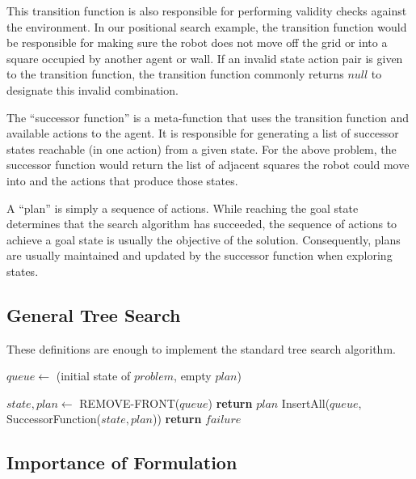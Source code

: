 This transition function is also responsible for performing validity checks against the environment. In our positional search example, the transition function would be responsible for making sure the robot does not move off the grid or into a square occupied by another agent or wall. If an invalid state action pair is given to the transition function, the transition function commonly returns $null$ to designate this invalid combination.

The ``successor function'' is a meta-function that uses the transition function and available actions to the agent. It is responsible for generating a list of successor states reachable (in one action) from a given state. For the above problem, the successor function would return the list of adjacent squares the robot could move into and the actions that produce those states.

A ``plan'' is simply a sequence of actions. While reaching the goal state determines that the search algorithm has succeeded, the sequence of actions to achieve a goal state is usually the objective of the solution. Consequently, plans are usually maintained and updated by the successor function when exploring states.

	\subsection{General Tree Search}

These definitions are enough to implement the standard tree search algorithm.

\begin{algorithm}[H]
\begin{algorithmic}[1]
	\State $queue \gets$ (initial state of $problem$, empty $plan$)

		\State $state, plan \gets$ REMOVE-FRONT($queue$)
			\State \textbf{return} $plan$ 
		\EndIf
		\State InsertAll($queue$, SuccessorFunction($state, plan$)) 
	\EndWhile
	\State \textbf{return} $failure$ 

\EndFunction

\end{algorithmic}
\end{algorithm}

	\subsection{Importance of Formulation}

